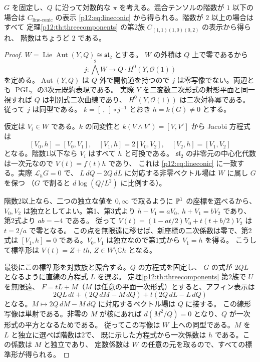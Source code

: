 \begin{theorem}\label{p12:th:conic-log-classification}
$G$ を固定し、$Q$ に沿って対数的な $\pi$ を考える。混合テンソルの階数が
$1$ 以下の場合は $C_{\mathrm{line\text{-}conic}}$ の表示
\eqref{p12:eq:lineconic} から得られる。階数が $2$ 以上の場合はすべて
定理\ref{p12:th:threecomponents} の第2族 $C_{(1,1)(1,0)(0,2)}$ の表示から得られ、
階数はちょうど $2$ である。
\end{theorem}
\begin{proof}
$W=\operatorname{Lie}\operatorname{Aut}(Y,Q)\cong\mathfrak{sl}_2$ とする。
$W$ の外積は $Q$ 上で零であるから
\[
 j:\textstyle\bigwedge^2 W\longrightarrow Q\cdot H^0(Y,\mathcal O(1))
\]
を定める。$\operatorname{Aut}(Y,Q)$ は $Q$ 外で開軌道を持つので
$j$ は零写像でない。両辺とも $\operatorname{PGL}_2$ の3次元既約表現である。
実際 $Y$ を二変数二次形式の射影平面と同一視すれば $Q$ は判別式二次曲線であり、
$H^0(Y,\mathcal O(1))$ は二次対称冪である。従って $j$ は同型である。
$k=[\ ,\ ]\circ j^{-1}$ とおき $h=k(G)\ne0$ とする。

仮定は $V_i\in W$ である。$k$ の同変性と $k(V\wedge V')=[V,V']$ から
Jacobi 方程式は
\[
 [V_0,h]=[V_0,V_1],\quad [V_1,h]=2[V_0,V_2],\quad
 [V_2,h]=[V_1,V_2]
\]
となる。階数1以下なら $V_i$ はすべて $h$ と可換である。
$\mathfrak{sl}_2$ の非零元の中心化代数は一次元なので $V(t)=f(t)h$ であり、
これは \eqref{p12:eq:lineconic} に一致する。実際 $\mathcal L_hG=0$ で、
$L\,dQ-2Q\,dL$ に対応する非零ベクトル場は $W$ に属し $G$ を保つ
（$G$ で割ると $d\log(Q/L^2)$ に比例する）。

階数2以上なら、二つの独立な値を $0,\infty$ で取るように
$\mathbb P^1$ の座標を選べるから、$V_0,V_2$ は独立としてよい。第1、第3式より
$h-V_1=aV_0,\ h+V_1=bV_2$ であり、第2式より $ab=-4$ である。
従って $V(t)=(1-at/2)V_0+t(t+b/2)V_2$ は $t=2/a$ で零となる。
この点を無限遠に移せば、新座標の二次係数は零で、第2式は
$[V_1,h]=0$ である。$V_0,V_1$ は独立なので第1式から $V_1=h$ を得る。
こうして標準形は $V(t)=Z+th$, $Z\in W\setminus\mathbb Ch$ となる。

最後にこの標準形を対数族と照合する。$Q$ の方程式を固定し、
$G$ の式が $2QL$ となるように直線の方程式 $L$ を選ぶ。
定理\ref{p12:th:threecomponents} 第2族で $U$ を無限遠、
$F=tL+M$（$M$ は任意の平面一次形式）とすると、アフィン表示は
\[
 2QL\,dt+(2Q\,dM-M\,dQ)+t(2Q\,dL-L\,dQ)
\]
となる。$M\mapsto 2Q\,dM-M\,dQ$ に対応するベクトル場は $Q$ に接する。
この線形写像は単射である。非零の $M$ が核にあれば
$d(M^2/Q)=0$ となり、$Q$ が一次形式の平方となるためである。
従ってこの写像は $W$ 上への同型である。$M$ を $L$ と独立に選べば階数は2で、
既に示した方程式から一次係数は $h$ である。この係数は $M$ と独立であり、
定数係数は $W$ の任意の元を取るので、すべての標準形が得られる。
\end{proof}

